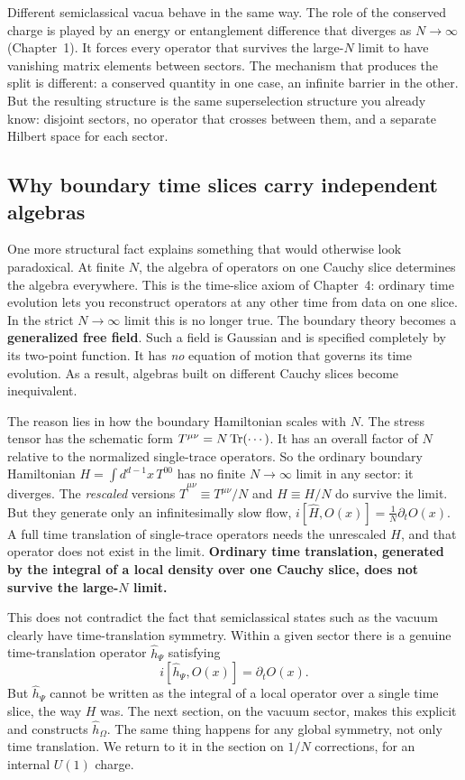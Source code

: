 \begin{physconnect}
Different semiclassical vacua behave in the same way. The role of the conserved charge is played by an energy
or entanglement difference that diverges as $N\to\infty$ (Chapter~1). It forces every operator that survives the
large-$N$ limit to have vanishing matrix elements between sectors. The mechanism that produces the split is
different: a conserved quantity in one case, an infinite barrier in the other. But the resulting structure is
the same superselection structure you already know: disjoint sectors, no operator that crosses between them,
and a separate Hilbert space for each sector.
\end{physconnect}

\subsection*{Why boundary time slices carry independent algebras}

One more structural fact explains something that would otherwise look paradoxical. At finite $N$, the algebra
of operators on one Cauchy slice determines the algebra everywhere. This is the time-slice axiom of Chapter~4:
ordinary time evolution lets you reconstruct operators at any other time from data on one slice. In the strict
$N\to\infty$ limit this is no longer true. The boundary theory becomes a \textbf{generalized free field}. Such a
field is Gaussian and is specified completely by its two-point function. It has \emph{no} equation of motion
that governs its time evolution. As a result, algebras built on different Cauchy slices become inequivalent.

The reason lies in how the boundary Hamiltonian scales with $N$. The stress tensor has the schematic form
$T^{\mu\nu}=N\operatorname{Tr}(\cdots)$. It has an overall factor of $N$ relative to the normalized single-trace operators.
So the ordinary boundary Hamiltonian $H=\int d^{d-1}x\,T^{00}$ has no finite $N\to\infty$ limit in any sector:
it diverges. The \emph{rescaled} versions $\widehat T^{\mu\nu}\equiv T^{\mu\nu}/N$ and $\widehat H\equiv H/N$ do
survive the limit. But they generate only an infinitesimally slow flow,
$i[\widehat H,O(x)]=\tfrac1N\partial_tO(x)$. A full time translation of single-trace operators needs the
unrescaled $H$, and that operator does not exist in the limit. \textbf{Ordinary time translation, generated by
the integral of a local density over one Cauchy slice, does not survive the large-$N$ limit.}

This does not contradict the fact that semiclassical states such as the vacuum clearly have time-translation
symmetry. Within a given sector there is a genuine time-translation operator $\hat h_\Psi$ satisfying
\begin{equation}
i[\hat h_\Psi,O(x)]=\partial_tO(x) .
\label{eq:ads-htrans}
\end{equation}
But $\hat h_\Psi$ cannot be written as the integral of a local operator over a single time slice, the way $H$
was. The next section, on the vacuum sector, makes this explicit and constructs $\hat h_\Omega$. The same thing
happens for any global symmetry, not only time translation. We return to it in the section on $1/N$
corrections, for an internal $U(1)$ charge.

